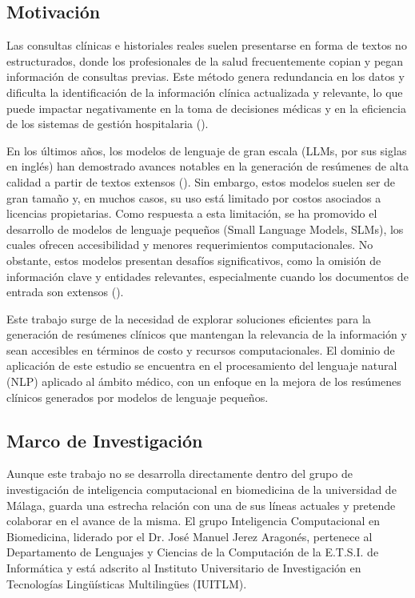 \documentclass[../main.tex]{subfiles}
\begin{document}
\subsection{Motivación}
Las consultas clínicas e historiales reales suelen presentarse en forma de textos no estructurados, donde los profesionales de la
salud frecuentemente copian y pegan información de consultas previas. Este método genera redundancia en los datos y dificulta
la identificación de la información clínica actualizada y relevante, lo que puede impactar negativamente en la toma de decisiones
médicas y en la eficiencia de los sistemas de gestión hospitalaria (\cite{searle2021estimating}).

En los últimos años, los modelos de lenguaje de gran escala (LLMs, por sus siglas en inglés) han demostrado avances notables
en la generación de resúmenes de alta calidad a partir de textos extensos (\cite{zhang2025comprehensivesurveyprocessorientedautomatic}). Sin embargo, estos modelos suelen ser de gran
tamaño y, en muchos casos, su uso está limitado por costos asociados a licencias propietarias. Como respuesta a esta limitación,
se ha promovido el desarrollo de modelos de lenguaje pequeños (Small Language Models, SLMs), los cuales ofrecen accesibilidad
y menores requerimientos computacionales. No obstante, estos modelos presentan desafíos significativos, como la omisión de
información clave y entidades relevantes, especialmente cuando los documentos de entrada son extensos (\cite{zhang2024optimizingautomaticsummarizationlong,grail2021globalizing}).

Este trabajo surge de la necesidad de explorar soluciones eficientes para la generación de resúmenes clínicos que mantengan la
relevancia de la información y sean accesibles en términos de costo y recursos computacionales. El dominio de aplicación de este
estudio se encuentra en el procesamiento del lenguaje natural (NLP) aplicado al ámbito médico, con un enfoque en la mejora de
los resúmenes clínicos generados por modelos de lenguaje pequeños.





\subsection{Marco de Investigación}

Aunque este trabajo no se desarrolla directamente dentro del grupo de investigación de inteligencia computacional en biomedicina de la universidad de Málaga, guarda una estrecha relación con una de sus líneas actuales y pretende colaborar en el avance de la misma. El grupo Inteligencia Computacional en Biomedicina, liderado por el Dr. José Manuel Jerez Aragonés, pertenece al Departamento de Lenguajes y Ciencias de la Computación de la E.T.S.I. de Informática y está adscrito al Instituto Universitario de Investigación en Tecnologías Lingüísticas Multilingües (IUITLM).
\end{document}
